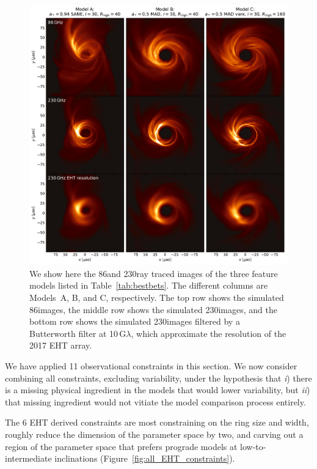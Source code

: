\begin{figure}
  \centering
  \includegraphics[width=\textwidth]{figures/bestbet_imgs.pdf}
  \caption{We show here the 86\GHz and 230\GHz ray traced images of
    the three feature models listed in Table~\ref{tab:bestbets}.
    The different columns are Models~A, B, and C, respectively.
    The top row shows the simulated 86\GHz images, the middle row
    shows the simulated 230\GHz images, and the bottom row shows the
    simulated 230\GHz images filtered by a Butterworth filter at
    10$\,\mathrm{G}\lambda$, which approximate the resolution of the
    2017 EHT array.
    }
  \label{fig:bestbet_imgs}
\end{figure}


We have applied 11 observational constraints in this section.
We now consider combining all constraints, excluding variability,
under the hypothesis that
\emph{i}) there is a missing physical ingredient in the models that
would lower variability, but
\emph{ii}) that missing ingredient would not vitiate the model
comparison process entirely.

The 6 EHT derived constraints are most constraining on the ring size
and width, roughly reduce the dimension of the parameter space by two,
and carving out a region of the parameter space that prefers prograde
models at low-to-intermediate inclinations
(Figure~\ref{fig:all_EHT_constraints}).

